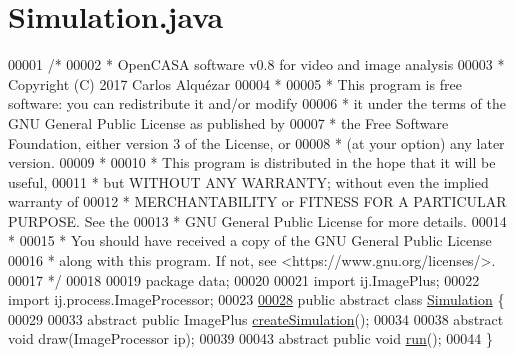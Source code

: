\hypertarget{_simulation_8java_source}{}\section{Simulation.\+java}
\label{_simulation_8java_source}

\begin{DoxyCode}
00001 \textcolor{comment}{/*}
00002 \textcolor{comment}{ *   OpenCASA software v0.8 for video and image analysis}
00003 \textcolor{comment}{ *   Copyright (C) 2017  Carlos Alquézar}
00004 \textcolor{comment}{ *}
00005 \textcolor{comment}{ *   This program is free software: you can redistribute it and/or modify}
00006 \textcolor{comment}{ *   it under the terms of the GNU General Public License as published by}
00007 \textcolor{comment}{ *   the Free Software Foundation, either version 3 of the License, or}
00008 \textcolor{comment}{ *   (at your option) any later version.}
00009 \textcolor{comment}{ *}
00010 \textcolor{comment}{ *   This program is distributed in the hope that it will be useful,}
00011 \textcolor{comment}{ *   but WITHOUT ANY WARRANTY; without even the implied warranty of}
00012 \textcolor{comment}{ *   MERCHANTABILITY or FITNESS FOR A PARTICULAR PURPOSE.  See the}
00013 \textcolor{comment}{ *   GNU General Public License for more details.}
00014 \textcolor{comment}{ *}
00015 \textcolor{comment}{ *   You should have received a copy of the GNU General Public License}
00016 \textcolor{comment}{ *   along with this program.  If not, see <https://www.gnu.org/licenses/>.}
00017 \textcolor{comment}{*/}    
00018 
00019 \textcolor{keyword}{package }data;
00020 
00021 \textcolor{keyword}{import} ij.ImagePlus;
00022 \textcolor{keyword}{import} ij.process.ImageProcessor;
00023 
\hypertarget{_simulation_8java_source_l00028}{}\hyperlink{classdata_1_1_simulation}{00028} \textcolor{keyword}{public} \textcolor{keyword}{abstract} \textcolor{keyword}{class }\hyperlink{classdata_1_1_simulation}{Simulation} \{
00029 
00033   \textcolor{keyword}{abstract} \textcolor{keyword}{public} ImagePlus \hyperlink{classdata_1_1_simulation_a7fdb72bfe49073e67efb68abd6f58ac4}{createSimulation}();
00034 
00038   \textcolor{keyword}{abstract} \textcolor{keywordtype}{void} draw(ImageProcessor ip);
00039 
00043   \textcolor{keyword}{abstract} \textcolor{keyword}{public} \textcolor{keywordtype}{void} \hyperlink{classdata_1_1_simulation_ad68e8feb22b9629629b377701c6ef3e7}{run}();
00044 \}
\end{DoxyCode}

